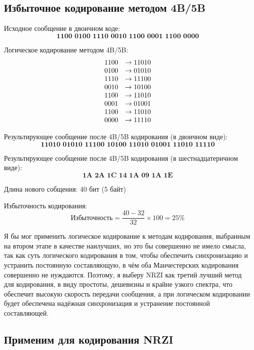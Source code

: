 \subsection{Избыточное кодирование методом 4B/5B}

\item Исходное сообщение в двоичном коде:
\[
	\textbf{1100 0100 1110 0010 1100 0001 1100 0000}
\]

\item Логическое кодирование методом 4B/5B:
\[
	\begin{array}{l l}
		\text{1100} & \rightarrow \text{11010} \\
		\text{0100} & \rightarrow \text{01010} \\
		\text{1110} & \rightarrow \text{11100} \\
		\text{0010} & \rightarrow \text{10100} \\
		\text{1100} & \rightarrow \text{11010} \\
		\text{0001} & \rightarrow \text{01001} \\
		\text{1100} & \rightarrow \text{11010} \\
		\text{0000} & \rightarrow \text{11110} \\
	\end{array}
\]

\item Результирующее сообщение после 4B/5B кодирования (в двоичном виде):
\[
	\textbf{11010 01010 11100 10100 11010 01001 11010 11110}
\]

\item Результирующее сообщение после 4B/5B кодирования (в шестнадцатеричном виде):
\[
	\textbf{1A 2A 1C 14 1A 09 1A 1E}
\]

\item Длина нового собщения: 40 бит (5 байт)
\item Избыточность кодирования:
\[
	\text{Избыточность} = \frac{40 - 32}{32} \times 100 = 25\%
\]

Я бы мог применить логическое кодирование к методам кодирования, выбранным на втором этапе в качестве наилучших, но это бы совершенно не имело смысла, так как суть логического кодирования в том, чтобы обеспечить синхронизацию и устранить постоянную составляющую, в чём оба Манчестерских кодирования совершенно не нуждаются. Поэтому, я выберу NRZI как третий лучший метод для кодирования, в виду простоты, дешевизны и крайне узкого спектра, что обеспечит высокую скорость передачи сообщения, а при логическом кодировании будет обеспечена надёжная синхронизация и устранение постоянной составляющей.

\subsection{Применим для кодирования NRZI}


